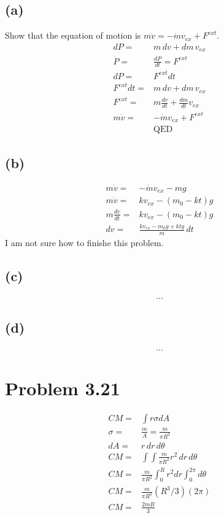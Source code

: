 \documentclass[12pt, a4paper]{article}
\begin{document}
\subsection*{(a)}
Show that the equation of motion is $m\dot{v} = -\dot{m}v_{ex} + F^{ext}$.
\begin{align*}
dP =& m \,dv + dm \, v_{ex}
\\
\dot{P} =& \frac{dP}{dt} = F^{ext}
\\
dP =& F^{ext}dt
\\
F^{ext}dt =& m \,dv + dm \, v_{ex}
\\
F^{ext} =& m \frac{dv}{dt} + \frac{dm}{dt} v_{ex}
\\
m\dot{v} =& -\dot{m}v_{ex} + F^{ext}
\\
&\text{QED}
\end{align*}
\subsection*{(b)}
\begin{align*}
    m\dot{v} =& -\dot{m}v_{ex} - mg
    \\
    m\dot{v} =& kv_{ex} - (m_0-kt)g
    \\
    m\frac{dv}{dt} =& kv_{ex} - (m_0-kt)g
    \\
    dv =& \frac{kv_{ex} - m_0g + ktg}{m} \, dt
\end{align*}
I am not sure how to finishe this problem. 
\subsection*{(c)}
\begin{align*}
...
\end{align*}
\subsection*{(d)}
\begin{align*}
...
\end{align*}



\pagebreak
\section*{Problem 3.21}
\begin{align*}
CM =& \int r\sigma dA 
\\
\sigma  =& \frac{m}{A} = \frac{m}{\pi R^2}
\\
dA =& r \, dr  \, d\theta
\\
CM =& \int\int  \frac{m}{\pi R^2} r^2 \, dr  \, d\theta 
\\
CM =& \frac{m}{\pi R^2} \int_0^R r^2  dr  \int_0^{2\pi} d\theta 
\\
CM =& \frac{m}{\pi R^2} (R^3/3) (2\pi)
\\
CM =& \boxed{\frac{2mR}{3}}
\end{align*}
\end{document}

